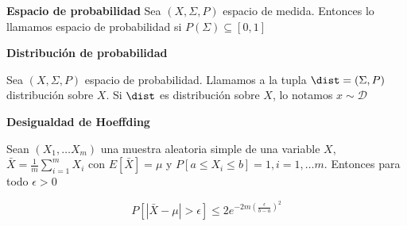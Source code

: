 \begin{definition} \textbf{Espacio de probabilidad}
 Sea $(X, \Sigma, P)$ espacio de medida. Entonces lo llamamos espacio de probabilidad si $P(\Sigma)\subseteq [0,1]$
\end{definition}


\begin{definition} \textbf{Distribución de probabilidad}

 Sea $(X, \Sigma, P)$ espacio de probabilidad. Llamamos a la tupla $\dist = (\Sigma,P)$ distribución sobre $X$. 
 Si $\dist$ es distribución sobre $X$, lo notamos $x\sim \mathcal{D}$
\end{definition}

\begin{lemma} \textbf{Desigualdad de Hoeffding}

 Sean $(X_1, \ldots X_m)$ una muestra aleatoria simple de una variable $X$, 
 $\bar{X} = \frac{1}{m} \sum_{i=1}^m X_i$ con $E[\bar{X}] = \mu$ y $P[a \le X_i \le b] = 1, i=1, \ldots m$. 
 Entonces para todo $\epsilon > 0$

 \[P\left[\left| \bar{X} - \mu \right| > \epsilon \right] \le 2e^{-2m \left(\frac{\epsilon}{b-a}\right)^2}\]
\end{lemma}